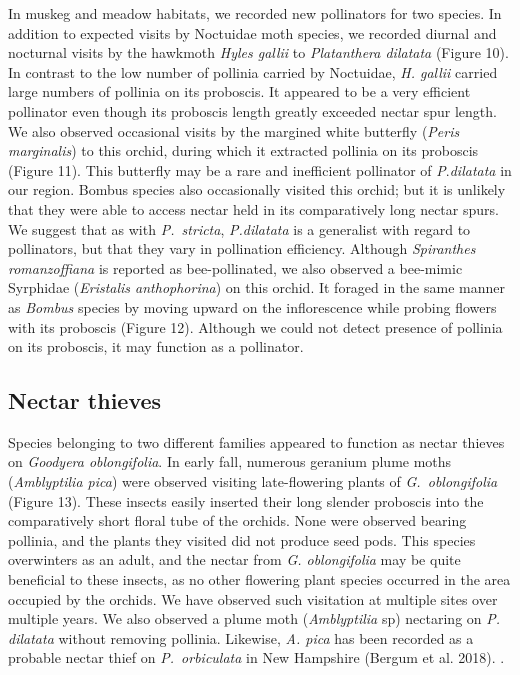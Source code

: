 \begin{multicols}{2}
In muskeg and meadow habitats, we recorded new pollinators for two
species. In addition to expected visits by Noctuidae moth species, we
recorded diurnal and nocturnal visits by the hawkmoth \emph{Hyles
gallii} to \emph{Platanthera dilatata} (Figure 10). In contrast to the
low number of pollinia carried by Noctuidae, \emph{H. gallii} carried
large numbers of pollinia on its proboscis. It appeared to be a very
efficient pollinator even though its proboscis length greatly exceeded
nectar spur length. We also observed occasional visits by the margined
white butterfly (\emph{Peris marginalis}) to this orchid, during which
it extracted pollinia on its proboscis (Figure 11). This butterfly may
be a rare and inefficient pollinator of \emph{P}.\emph{dilatata} in our
region. Bombus species also occasionally visited this orchid; but it is
unlikely that they were able to access nectar held in its comparatively
long nectar spurs. We suggest that as with \emph{P.\ stricta},
\emph{P.dilatata} is a generalist with regard to pollinators, but that
they vary in pollination efficiency. Although \emph{Spiranthes
romanzoffiana} is reported as bee-pollinated, we also observed a
bee-mimic Syrphidae (\emph{Eristalis anthophorina}) on this orchid. It
foraged in the same manner as \emph{Bombus} species by moving upward on
the inflorescence while probing flowers with its proboscis (Figure 12).
Although we could not detect presence of pollinia on its proboscis, it
may function as a pollinator.

\subsection{Nectar thieves}

Species belonging to two different families appeared to function as
nectar thieves on \emph{Goodyera oblongifolia}. In early fall, numerous
geranium plume moths (\emph{Amblyptilia pica}) were observed visiting
late-flowering plants of \emph{G.\ oblongifolia} (Figure 13). These
insects easily inserted their long slender proboscis into the
comparatively short floral tube of the orchids. None were observed
bearing pollinia, and the plants they visited did not produce seed pods.
This species overwinters as an adult, and the nectar from \emph{G.
oblongifolia} may be quite beneficial to these insects, as no other
flowering plant species occurred in the area occupied by the orchids. We
have observed such visitation at multiple sites over multiple years. We
also observed a plume moth (\emph{Amblyptilia} sp) nectaring on \emph{P.
dilatata} without removing pollinia. Likewise, \emph{A. pica} has been
recorded as a probable nectar thief on \emph{P.\ orbiculata} in New
Hampshire (Bergum et al. 2018). .


\end{multicols}
